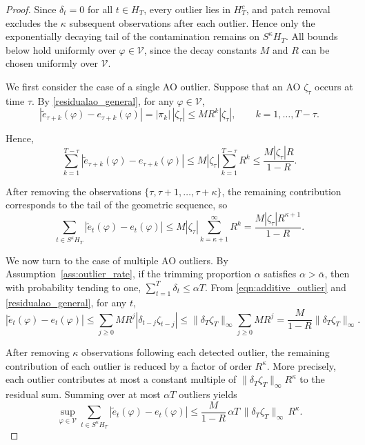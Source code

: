 \documentclass[12pt]{article}
\numberwithin{equation}{section}
\begin{document}
\begin{proof}
Since $\delta_t=0$ for all $t\in H_T$, every outlier lies in $H_T^c$, and patch removal excludes the $\kappa$ subsequent observations after each outlier. Hence only the exponentially decaying tail of the contamination remains on $S^\kappa H_T$.
All bounds below hold uniformly over $\varphi \in \mathcal V$, since the decay constants $M$ and $R$ can be chosen uniformly over $\mathcal V$.

We first consider the case of a single AO outlier. Suppose that an AO $\zeta_\tau$ occurs at time $\tau$. By \eqref{residualao_general}, for any $\varphi \in \mathcal V$,
\begin{equation}
\left| \tilde{e}_{\tau+k}(\varphi)-e_{\tau+k}(\varphi)\right|
=
|\pi_k|\,|\zeta_\tau|
\le
M R^k |\zeta_\tau|,
\qquad k=1,\ldots,T-\tau.
\end{equation}

Hence,
\begin{equation}
\sum_{k=1}^{T-\tau}
\left| \tilde{e}_{\tau+k}(\varphi)-e_{\tau+k}(\varphi)\right|
\le
M |\zeta_\tau| \sum_{k=1}^{T-\tau} R^k
\le
\frac{M |\zeta_\tau| R}{1-R}.
\end{equation}

After removing the observations $\{\tau,\tau+1,\ldots,\tau+\kappa\}$, the remaining contribution corresponds to the tail of the geometric sequence, so
\begin{equation}
\sum_{t \in S^\kappa H_T}
\left| \tilde{e}_t(\varphi)-e_t(\varphi)\right|
\le
M |\zeta_\tau| \sum_{k=\kappa+1}^{\infty} R^k
=
\frac{M |\zeta_\tau| R^{\kappa+1}}{1-R}.
\end{equation}

We now turn to the case of multiple AO outliers.
By Assumption~\ref{ass:outlier_rate}, if the trimming proportion $\alpha$ satisfies $\alpha>\bar\alpha$, then with probability tending to one,
$\sum_{t=1}^T \delta_t \le \alpha T$.
From \eqref{eqn:additive_outlier} and \eqref{residualao_general}, for any $t$,
\begin{equation}
\left| \tilde{e}_t(\varphi)-e_t(\varphi)\right|
\le
\sum_{j\ge 0} M R^j |\delta_{t-j}\zeta_{t-j}|
\le
\|\delta_T\zeta_T\|_\infty \sum_{j\ge 0} M R^j
=
\frac{M}{1-R}\|\delta_T\zeta_T\|_\infty.
\end{equation}

After removing $\kappa$ observations following each detected outlier, the remaining contribution of each outlier is reduced by a factor of order $R^\kappa$. More precisely, each outlier contributes at most a constant multiple of $\|\delta_T \zeta_T\|_\infty R^\kappa$ to the residual sum. Summing over at most $\alpha T$ outliers yields
\begin{equation}
\sup_{\varphi \in \mathcal V}
\sum_{t \in S^\kappa H_T}
\left| \tilde{e}_t(\varphi)-e_t(\varphi)\right|
\le
\frac{M}{1-R}\,\alpha T\,\|\delta_T\zeta_T\|_\infty\,R^\kappa.
\end{equation}


\end{proof}
\end{document}
